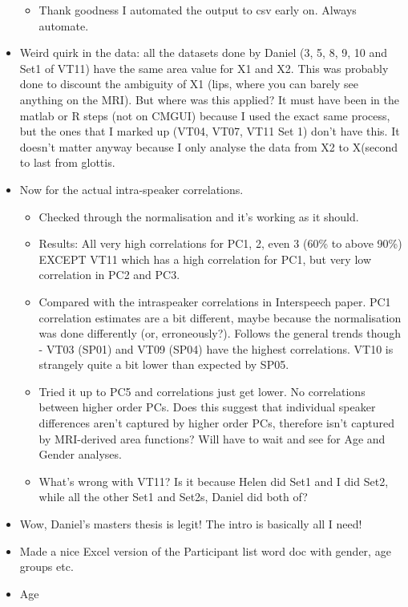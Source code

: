 \documentclass{article}
\begin{document}
\begin{itemize}
\begin{itemize}
        \item Thank goodness I automated the output to csv early on. Always automate. 
    \end{itemize}
    \item Weird quirk in the data: all the datasets done by Daniel (3, 5, 8, 9, 10 and Set1 of VT11) have the same area value for X1 and X2. This was probably done to discount the ambiguity of X1 (lips, where you can barely see anything on the MRI). But where was this applied? It must have been in the matlab or R steps (not on CMGUI) because I used the exact same process, but the ones that I marked up (VT04, VT07, VT11 Set 1) don't have this. It doesn't matter anyway because I only analyse the data from X2 to X(second to last from glottis.
    \item Now for the actual intra-speaker correlations.
    \begin{itemize}
        \item Checked through the normalisation and it's working as it should.
        \item Results: All very high correlations for PC1, 2, even 3 (60\% to above 90\%) EXCEPT VT11 which has a high correlation for PC1, but very low correlation in PC2 and PC3.
        \item Compared with the intraspeaker correlations in Interspeech paper. PC1 correlation estimates are a bit different, maybe because the normalisation was done differently (or, erroneously?). Follows the general trends though - VT03 (SP01) and VT09 (SP04) have the highest correlations. VT10 is strangely quite a bit lower than expected by SP05.
        \item Tried it up to PC5 and correlations just get lower. No correlations between higher order PCs. Does this suggest that individual speaker differences aren't captured by higher order PCs, therefore isn't captured by MRI-derived area functions? Will have to wait and see for Age and Gender analyses.
        \item What's wrong with VT11? Is it because Helen did Set1 and I did Set2, while all the other Set1 and Set2s, Daniel did both of?
    \end{itemize}
    \item Wow, Daniel's masters thesis is legit! The intro is basically all I need!
    \item Made a nice Excel version of the Participant list word doc with gender, age groups etc.
    \item Age
    \begin{itemize}

\end{itemize}
\end{itemize}
\end{document}

